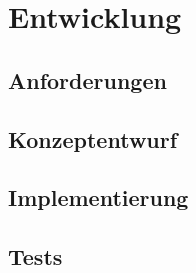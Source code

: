 \chapter{Entwicklung}\label{sec:Einleitung}

\section{Anforderungen}\label{Anforderungen}
\section{Konzeptentwurf}\label{Konzeptentwurf}
\section{Implementierung}\label{Implementierung}
\section{Tests}\label{Tests}
